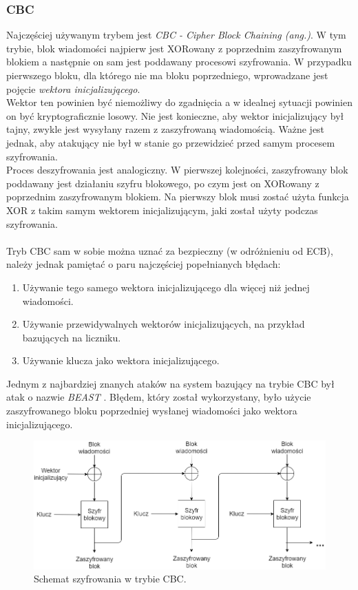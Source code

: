 \subsubsection{CBC}
Najczęściej używanym trybem jest \textit{CBC - Cipher Block Chaining (ang.)}. 
W tym trybie, blok wiadomości najpierw jest XORowany z poprzednim zaszyfrowanym blokiem a następnie
on sam jest poddawany procesowi szyfrowania. W przypadku pierwszego bloku, dla którego nie ma bloku poprzedniego, 
wprowadzane jest pojęcie \textit{wektora inicjalizującego}. \\ 
Wektor ten powinien być niemożliwy do zgadnięcia a w idealnej sytuacji powinien on być kryptograficznie losowy. Nie jest konieczne, aby wektor inicjalizujący był tajny, zwykle jest wysyłany razem z zaszyfrowaną wiadomością. Ważne jest jednak, aby atakujący nie był w stanie go przewidzieć przed samym procesem szyfrowania. \\ 
Proces deszyfrowania jest analogiczny. W pierwszej kolejności, zaszyfrowany blok poddawany jest działaniu szyfru 
blokowego, po czym jest on XORowany z poprzednim zaszyfrowanym blokiem. Na pierwszy blok musi zostać użyta funkcja XOR
z takim samym wektorem inicjalizującym, jaki został użyty podczas szyfrowania. \\\\
Tryb CBC sam w sobie można uznać za bezpieczny (w odróżnieniu od ECB), 
należy jednak pamiętać o paru najczęściej popełnianych błędach:
\begin{enumerate}
	\item Używanie tego samego wektora inicjalizującego dla więcej niż jednej wiadomości.
	\item Używanie przewidywalnych wektorów inicjalizujących, na przykład bazujących na liczniku.
	\item Używanie klucza jako wektora inicjalizującego. 
\end{enumerate}
Jednym z najbardziej znanych ataków na system bazujący na trybie CBC był atak o nazwie \textit{BEAST} \cite{beast}. 
Błędem, który został wykorzystany, było użycie zaszyfrowanego bloku poprzedniej wysłanej wiadomości jako wektora inicjalizującego.
\begin{figure}
    \centering
	\includegraphics[width=\textwidth]{content/images/cbc-enc-scheme}
    \caption{Schemat szyfrowania w trybie CBC.}
\end{figure}
